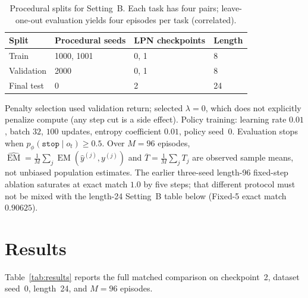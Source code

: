 \documentclass[11pt,a4paper]{article}
\begin{document}
\begin{table}[H]
\centering
\caption{Procedural splits for Setting~B. Each task has four pairs; leave-one-out
evaluation yields four episodes per task (correlated).}
\label{tab:splits}
\small
\begin{tabular}{@{}llll@{}}
\toprule
Split & Procedural seeds & LPN checkpoints & Length \\
\midrule
Train & 1000, 1001 & 0, 1 & 8 \\
Validation & 2000 & 0, 1 & 8 \\
Final test & 0 & 2 & 24 \\
\bottomrule
\end{tabular}
\end{table}

Penalty selection used validation return; selected $\lambda{=}0$, which does not
explicitly penalize compute (any step cut is a side effect).
Policy training: learning rate $0.01$, batch $32$, $100$ updates, entropy
coefficient $0.01$, policy seed~$0$.
Evaluation stops when $p_\phi(\texttt{stop}\mid o_t)\ge 0.5$.
Over $M{=}96$ episodes,
$\widehat{\operatorname{EM}}=\frac1M\sum_j\operatorname{EM}(\widehat{y}^{(j)},y^{(j)})$
and
$\overline{T}=\frac1M\sum_j T_j$
are observed sample means, not unbiased population estimates.
The earlier three-seed length-96 fixed-step ablation saturates at exact match
$1.0$ by five steps; that different protocol must not be mixed with the
length-24 Setting~B table below (Fixed-5 exact match $0.90625$).

\section{Results}

Table~\ref{tab:results} reports the full matched comparison on checkpoint~2,
dataset seed~0, length~24, and $M{=}96$ episodes.
\end{document}
